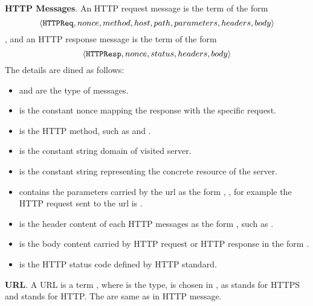 \begin{appendices}
\vspace{1mm}\noindent\textbf{HTTP Messages}.
An HTTP request message is the term of the form 
\begin{equation*}
\langle {{}\mathtt{HTTPReq}, nonce, method, host, path, parameters, headers, body} \rangle
\end{equation*}
, and an HTTP response message is the term of the form 
\begin{equation*}
    \langle {{}\mathtt{HTTPResp}, nonce, status, headers, body} \rangle
\end{equation*}
 The details are dined as follows:
 \begin{itemize}
 \item {} and  are the type of messages.
 \item {} is the constant nonce mapping the response with the specific request.
 \item {} is the HTTP method, such as  and .
 \item {} is the constant string domain of visited server.
 \item {} is the constant string representing the concrete resource of the server.
 \item {} contains the parameters carried by the url as the form , , for example the  HTTP request sent to the url   is .
 \item {} is the header content of each HTTP messages as the form , such as .
 \item {} is the body content carried by HTTP  request or HTTP response in the form .
  \item {} is the HTTP status code defined by HTTP standard.
 \end{itemize}
 
\vspace{1mm}\noindent\textbf{URL}.
A URL is a term , where  is the type,  is chosen in {, } as  stands for HTTPS and  stands for HTTP. The  are same as in HTTP message. 


\end{appendices}
